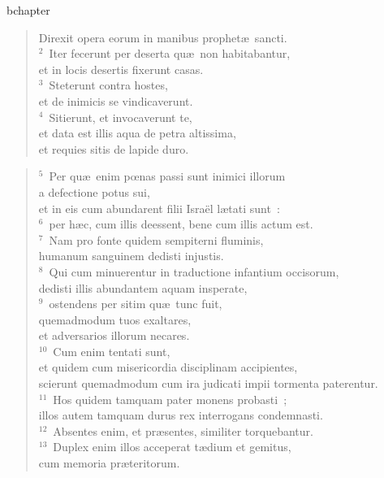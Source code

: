 bchapter\begin{verse}\vspace{-19pt}Direxit opera eorum in manibus prophet\ae\ sancti.\\
${}^{2}$~Iter fecerunt per deserta qu\ae\ non habitabantur,\\ et in locis desertis fixerunt casas.\\
${}^{3}$~Steterunt contra hostes,\\ et de inimicis se vindicaverunt.\\
${}^{4}$~Sitierunt, et invocaverunt te,\\ et data est illis aqua de petra altissima,\\ et requies sitis de lapide duro.\end{verse}


\begin{verse}${}^{5}$~Per qu\ae\ enim pœnas passi sunt inimici illorum\\ a defectione potus sui,\\ et in eis cum abundarent filii Isra\"el l\ae tati sunt~:\\
${}^{6}$~per h\ae c, cum illis deessent, bene cum illis actum est.\\
${}^{7}$~Nam pro fonte quidem sempiterni fluminis,\\ humanum sanguinem dedisti injustis.\\
${}^{8}$~Qui cum minuerentur in traductione infantium occisorum,\\ dedisti illis abundantem aquam insperate,\\
${}^{9}$~ostendens per sitim qu\ae\ tunc fuit,\\ quemadmodum tuos exaltares,\\ et adversarios illorum necares.\\
${}^{10}$~Cum enim tentati sunt,\\ et quidem cum misericordia disciplinam accipientes,\\ scierunt quemadmodum cum ira judicati impii tormenta paterentur.\\
${}^{11}$~Hos quidem tamquam pater monens probasti~;\\ illos autem tamquam durus rex interrogans condemnasti.\\
${}^{12}$~Absentes enim, et pr\ae sentes, similiter torquebantur.\\
${}^{13}$~Duplex enim illos acceperat t\ae dium et gemitus,\\ cum memoria pr\ae teritorum.\\

\end{verse}
